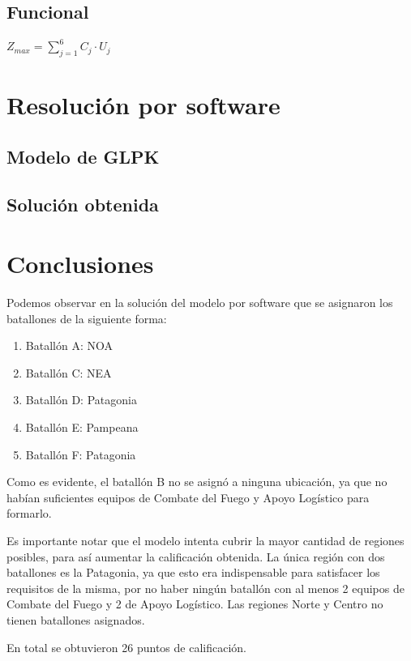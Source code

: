 \documentclass[12pt]{article}
\begin{document}
\subsection{Funcional}

$Z_{max} = \sum_{j=1}^{6} C_{j} \cdot U_{j}$

\section{Resolución por software}

\subsection{Modelo de GLPK}



\subsection{Solución obtenida}



\section{Conclusiones}

Podemos observar en la solución del modelo por software que se asignaron los batallones de la siguiente forma:

\begin{enumerate}
	\item Batallón A: NOA
	\item Batallón C: NEA
	\item Batallón D: Patagonia
	\item Batallón E: Pampeana
	\item Batallón F: Patagonia
\end{enumerate}

Como es evidente, el batallón B no se asignó a ninguna ubicación, ya que no habían suficientes equipos de Combate del Fuego y Apoyo Logístico para formarlo.

Es importante notar que el modelo intenta cubrir la mayor cantidad de regiones posibles, para así aumentar la calificación obtenida. La única región con dos batallones es la Patagonia, ya que esto era indispensable para satisfacer los requisitos de la misma, por no haber ningún batallón con al menos 2 equipos de Combate del Fuego y 2 de Apoyo Logístico. Las regiones Norte y Centro no tienen batallones asignados.

En total se obtuvieron 26 puntos de calificación.
\end{document}
